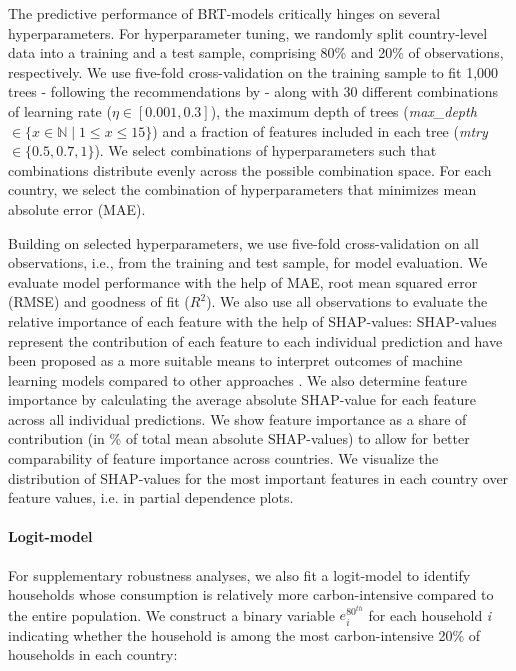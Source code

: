 \documentclass[12pt, a4paper]{article}
\begin{document}
The predictive performance of BRT-models critically hinges on several hyperparameters. For hyperparameter tuning, we randomly split country-level data into a training and a test sample, comprising 80\% and 20\% of observations, respectively. We use five-fold cross-validation on the training sample to fit 1,000 trees - following the recommendations by \textcite{Elith.2008} - along with 30 different combinations of learning rate ($\eta \in [0.001,0.3]$), the maximum depth of trees (\textit{max\_depth} $\in \{x \in \mathbb{N} \mid 1  \leq x \leq 15 \}$) and a fraction of features included in each tree (\textit{mtry} $\in \{0.5,0.7,1\}$). We select combinations of hyperparameters such that combinations distribute evenly across the possible combination space. For each country, we select the combination of hyperparameters that minimizes mean absolute error (MAE).

Building on selected hyperparameters, we use five-fold cross-validation on all observations, i.e., from the training and test sample, for model evaluation. We evaluate model performance with the help of MAE, root mean squared error (RMSE) and goodness of fit ($R^{2}$). We also use all observations to evaluate the relative importance of each feature with the help of SHAP-values: SHAP-values represent the contribution of each feature to each individual prediction and have been proposed as a more suitable means to interpret outcomes of machine learning models compared to other approaches \autocite{Lundberg.2020}. We also determine feature importance by calculating the average absolute SHAP-value for each feature across all individual predictions. We show feature importance as a share of contribution (in \% of total mean absolute SHAP-values) to allow for better comparability of feature importance across countries. We visualize the distribution of SHAP-values for the most important features in each country over feature values, i.e. in partial dependence plots. 

\paragraph{Logit-model} For supplementary robustness analyses, we also fit a logit-model to identify households whose consumption is relatively more carbon-intensive compared to the entire population. We construct a binary variable $e_{i}^{80^{th}}$ for each household \textit{i} indicating whether the household is among the most carbon-intensive 20\% of households in each country:
\end{document}
